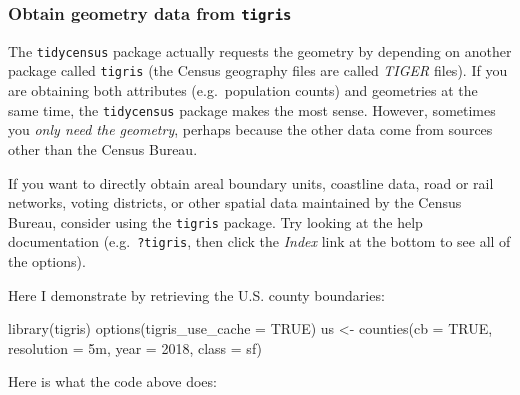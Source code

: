 \documentclass[
]{book}
\newenvironment{Shaded}{\begin{snugshade}}{\end{snugshade}}
\newcommand{\AttributeTok}[1]{\textcolor[rgb]{0.77,0.63,0.00}{#1}}
\newcommand{\ConstantTok}[1]{\textcolor[rgb]{0.00,0.00,0.00}{#1}}
\newcommand{\DecValTok}[1]{\textcolor[rgb]{0.00,0.00,0.81}{#1}}
\newcommand{\FunctionTok}[1]{\textcolor[rgb]{0.00,0.00,0.00}{#1}}
\newcommand{\NormalTok}[1]{#1}
\newcommand{\OtherTok}[1]{\textcolor[rgb]{0.56,0.35,0.01}{#1}}
\newcommand{\StringTok}[1]{\textcolor[rgb]{0.31,0.60,0.02}{#1}}
\begin{document}
\hypertarget{obtain-geometry-data-from-tigris}{%
\subsubsection{\texorpdfstring{Obtain geometry data from \texttt{tigris}}{Obtain geometry data from tigris}}\label{obtain-geometry-data-from-tigris}}

The \texttt{tidycensus} package actually requests the geometry by depending on another package called \texttt{tigris} (the Census geography files are called \emph{TIGER} files). If you are obtaining both attributes (e.g.~population counts) and geometries at the same time, the \texttt{tidycensus} package makes the most sense. However, sometimes you \emph{only need the geometry}, perhaps because the other data come from sources other than the Census Bureau.

If you want to directly obtain areal boundary units, coastline data, road or rail networks, voting districts, or other spatial data maintained by the Census Bureau, consider using the \texttt{tigris} package. Try looking at the help documentation (e.g.~\texttt{?tigris}, then click the \emph{Index} link at the bottom to see all of the options).

Here I demonstrate by retrieving the U.S. county boundaries:

\begin{Shaded}
\begin{Highlighting}[]
\FunctionTok{library}\NormalTok{(tigris)}
\FunctionTok{options}\NormalTok{(}\AttributeTok{tigris\_use\_cache =} \ConstantTok{TRUE}\NormalTok{)}
\NormalTok{us }\OtherTok{\textless{}{-}} \FunctionTok{counties}\NormalTok{(}\AttributeTok{cb =} \ConstantTok{TRUE}\NormalTok{,}
                        \AttributeTok{resolution =} \StringTok{\textquotesingle{}5m\textquotesingle{}}\NormalTok{, }
                        \AttributeTok{year =} \DecValTok{2018}\NormalTok{,}
                        \AttributeTok{class =} \StringTok{\textquotesingle{}sf\textquotesingle{}}\NormalTok{)}
\end{Highlighting}
\end{Shaded}

Here is what the code above does:
\end{document}
